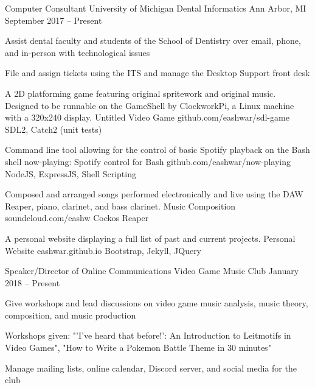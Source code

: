 \documentclass[]{awesome-cv}
\begin{document}
	\vspace{-4mm}
	\cventry
	{Computer Consultant}
	{University of Michigan Dental Informatics}
	{Ann Arbor, MI}
	{September 2017 – Present}
	{\begin{cvitems}
		\item {Assist dental faculty and students of the School of Dentistry over email, phone, and in-person with technological issues}
		\item {File and assign tickets using the ITS and manage the Desktop Support front desk}
		\end{cvitems}}

\vspace{-6mm}
\vspace{-3mm}

	\cventry
	{A 2D platforming game featuring original spritework and original music. Designed to be runnable on the GameShell by ClockworkPi, a Linux machine with a 320x240 display.}
	{Untitled Video Game}
	{github.com/eashwar/sdl-game}
	{SDL2, Catch2 (unit tests)}
	{}

	\vspace{-6mm}
	\cventry
	{Command line tool allowing for the control of basic Spotify playback on the Bash shell}
	{now-playing: Spotify control for Bash}
	{github.com/eashwar/now-playing}
	{NodeJS, ExpressJS, Shell Scripting}
	{}
	
	\vspace{-6mm}
	\cventry
	{Composed and arranged songs performed electronically and live using the DAW Reaper, piano, clarinet, and bass clarinet.}
	{Music Composition}
	{soundcloud.com/eashw}
	{Cockos Reaper}
	{}
	
	\vspace{-6mm}
	\cventry
	{A personal website displaying a full list of past and current projects.}
	{Personal Website}
	{eashwar.github.io}
	{Bootstrap, Jekyll, JQuery}
	{}
	
	\vspace{-6mm}

\vspace{-2mm}
\vspace{-3mm}
	\cventry
	{Speaker/Director of Online Communications}
	{Video Game Music Club}
	{}
	{January 2018 – Present}
	{\begin{cvitems}
		\item {Give workshops and lead discussions on video game music analysis, music theory, composition, and music production}
		\item {Workshops given: "'I've heard that before!': An Introduction to Leitmotifs in Video Games", "How to Write a Pokemon Battle Theme in 30 minutes"}
		\item {Manage mailing lists, online calendar, Discord server, and social media for the club}
		\end{cvitems}}
\end{document}
